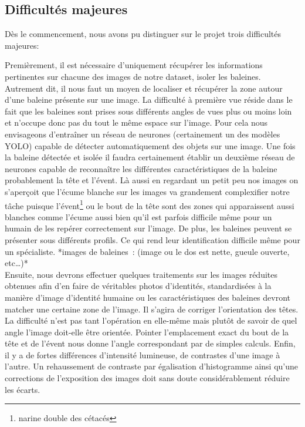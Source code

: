 \documentclass[12pt,a4paper]{report}
\begin{document}
\begin{spacing}{1.5}

\subsection{Difficultés majeures}
Dès le commencement, nous avons pu distinguer sur le projet trois difficultés majeures:


Premièrement, il est nécessaire d’uniquement récupérer les informations pertinentes sur chacune des images de notre dataset, isoler les baleines. Autrement dit, il nous faut un moyen de localiser et récupérer la zone autour d’une baleine présente sur une image. La difficulté à première vue réside dans le fait que les baleines sont prises sous différents angles de vues plus ou moins loin et n’occupe donc pas du tout le même espace sur l’image. Pour cela nous envisageons d’entraîner un réseau de neurones (certainement un des modèles YOLO) capable de  détecter automatiquement des objets sur une image. Une fois la baleine détectée et isolée il faudra certainement établir un deuxième réseau de neurones capable de reconnaître les différentes caractéristiques de la baleine probablement la tête et l’évent. Là aussi en regardant un petit peu nos images on s’aperçoit que l’écume blanche sur les images va grandement complexifier notre tâche puisque l’évent\footnote{narine double des cétacés } ou le bout de la tête sont des zones qui apparaissent aussi blanches comme l’écume aussi bien qu'il est parfois difficile même pour un humain de les repérer correctement sur l'image. De plus, les baleines peuvent se présenter sous différents profils. Ce qui rend leur identification difficile même pour un spécialiste.
*images de baleines : (image ou le dos est nette, gueule ouverte, etc…)*
\\

Ensuite, nous devrons effectuer quelques traitements sur les images réduites obtenues afin d’en faire de véritables photos d’identités, standardisées à la manière d'image d'identité humaine ou les caractéristiques des baleines devront matcher une certaine zone de l'image. Il s'agira de corriger l’orientation des têtes. La difficulté n’est pas tant l’opération en elle-même mais plutôt de savoir de quel angle l’image doit-elle être orientée. Pointer l’emplacement exact du bout de la tête et de l’évent nous donne l’angle correspondant par de simples calculs. Enfin, il y a de fortes différences d’intensité lumineuse, de contrastes d’une image à l’autre. Un rehaussement de contraste par égalisation d’histogramme ainsi qu'une corrections de l'exposition des images doit sans doute considérablement réduire les écarts. 
\\ 


\end{spacing}
\end{document}
